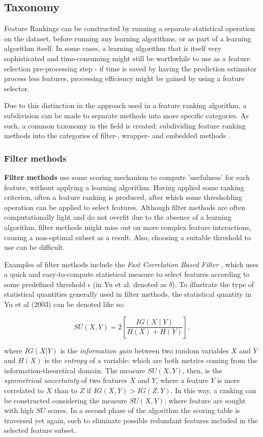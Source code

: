 \documentclass{article}
\begin{document}
\subsection{Taxonomy}
Feature Rankings can be constructed by running a separate statistical operation on the dataset, before running any learning algorithms, or as part of a learning algorithm itself. In some cases, a learning algorithm that is itself very sophisticated and time-consuming might still be worthwhile to use as a feature selection pre-processing step - if time is saved by having the prediction estimator process less features, processing efficiency might be gained by using a feature selector.

Due to this distinction in the approach used in a feature ranking algorithm, a subdivision can be made to separate methods into more specific categories. As such, a common taxonomy in the field is created: subdividing feature ranking methods into the categories of filter-, wrapper- and embedded methods \citep{chandrashekar_survey_2014}.

\subsubsection{Filter methods}
\textbf{Filter methods} use some scoring mechanism to compute 'usefulness' for each feature, without applying a learning algorithm. Having applied some ranking criterion, often a feature ranking is produced, after which some thresholding operation can be applied to select features. Although filter methods are often computationally light and do not overfit due to the absence of a learning algorithm, filter methods might miss out on more complex feature interactions, causing a non-optimal subset as a result. Also, choosing a suitable threshold to use can be difficult.

Examples of filter methods include the \textit{Fast Correlation Based Filter} \citep{yu_feature_2003}, which uses a quick and easy-to-compute statistical measure to select features according to some predefined threshold $\epsilon$ (in Yu et al. denoted as $\delta$). To illustrate the type of statistical quantities generally used in filter methods, the statistical quantity in Yu et al (2003) can be denoted like so:

$$
S U(X, Y)=2\left[\frac{I G(X \mid Y)}{H(X)+H(Y)}\right],
$$

where $I G(X|Y)$ is the \textit{information gain} between two random variables $X$ and $Y$ and $H(X)$ is the \textit{entropy} of a variable: which are both metrics coming from the information-theoretical domain. The measure $SU(X, Y)$, then, is the \textit{symmetrical uncertainty} of two features $X$ and $Y$, where a feature $Y$ is more correlated to $X$ than to $Z$ if $IG(X, Y) > IG(Z, Y)$. In this way, a ranking can be constructed considering the measure $SU(X, Y)$, where feature are sought with high $SU$ scores. In a second phase of the algorithm the scoring table is traversed yet again, such to eliminate possible redundant features included in the selected feature subset.
\end{document}
